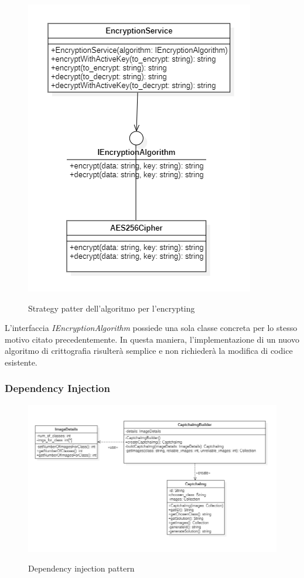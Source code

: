 \begin{figure}[H]
    \centering
    \includegraphics[scale = 0.8]{img/cryptStrategy.png}\\
    \caption{Strategy patter dell'algoritmo per l'encrypting}
\end{figure}

L'interfaccia \textit{IEncryptionAlgorithm} possiede una sola classe concreta per lo stesso motivo citato precedentemente. In questa maniera, l'implementazione di un nuovo algoritmo di crittografia risulterà semplice e non richiederà la modifica di codice esistente.

\subsubsection{Dependency Injection}

\begin{figure}[H]
    \centering
    \includegraphics[scale = 0.7]{img/dependency_injection.png}\\
    \caption{Dependency injection pattern}
\end{figure}

